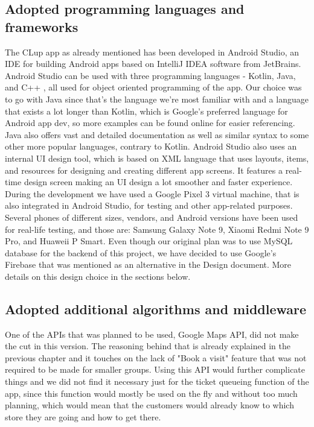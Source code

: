 \subsection{Adopted programming languages and frameworks}
\hspace{\parindent} The CLup app as already mentioned has been developed in Android Studio, an IDE for building Android apps based on IntelliJ IDEA software from JetBrains. Android Studio can be used with three programming languages - Kotlin, Java, and C++ , all used for object oriented programming of the app. \newline
Our choice was to go with Java since that's the language we're most familiar with and a language that exists a lot longer than Kotlin, which is Google's preferred language for Android app dev, so more examples can be found online for easier referencing. \newline
Java also offers vast and detailed documentation as well as similar syntax to some other more popular languages, contrary to Kotlin. \newline
Android Studio also uses an internal UI design tool, which is based on XML language that uses layouts, items, and resources for designing and creating different app screens. It features a real-time design screen making an UI design a lot smoother and faster experience. \newline
During the development we have used a Google Pixel 3 virtual machine, that is also integrated in Android Studio, for testing and other app-related purposes.\newline 
Several phones of different sizes, vendors, and Android versions have been used for real-life testing, and those are: Samsung Galaxy Note 9, Xiaomi Redmi Note 9 Pro, and Huaweii P Smart.  \newline
Even though our original plan was to use MySQL database for the backend of this project, we have decided to use Google's Firebase that was mentioned as an alternative in the Design document. More details on this design choice in the sections below.

\subsection{Adopted additional algorithms and middleware}
\hspace{\parindent} One of the APIs that was planned to be used, Google Maps API, did not make the cut in this version. The reasoning behind that is already explained in the previous chapter and it touches on the lack of "Book a visit" feature that was not required to be made for smaller groups. Using this API would further complicate things and we did not find it necessary just for the ticket queueing function of the app, since this function would mostly be used on the fly and without too much planning, which would mean that the customers would already know to which store they are going and how to get there. \newline

